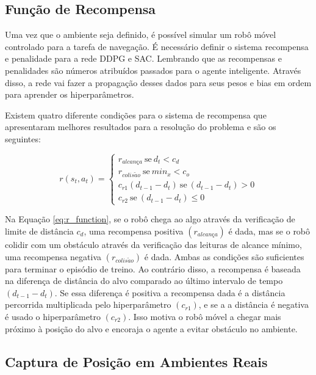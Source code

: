 \subsection{Função de Recompensa}
\label{sec:r_function}

Uma vez que o ambiente seja definido, é possível simular um robô móvel controlado para a tarefa de navegação.
É necessário definir o sistema recompensa e penalidade para a rede DDPG e SAC.
Lembrando que as recompensas e penalidades são números atribuídos passados para o agente inteligente.
Através disso, a rede vai fazer a propagação desses dados para seus pesos e bias em ordem para aprender os hiperparâmetros.

Existem quatro diferente condições para o sistema de recompensa que apresentaram melhores resultados para a resolução do problema e são os seguintes:

\begin{equation}
r (s_t, a_t) = 
\begin{cases}
r_{alcan\textit{ç}a} \ \textrm{se} \ d_t < c_d
\\
r_{colis\tilde{a}o} \ \textrm{se}\ min_x < c_o
\\
c_{r1}(d_{t-1} - d_t) \ \textrm{se} \ (d_{t-1} - d_t) > 0
\\
c_{r2} \ \textrm{se} \ (d_{t-1} - d_t) \leq 0
\end{cases}
\label{eq:r_function}
\end{equation}

Na Equação \ref{eq:r_function}, se o robô chega ao algo através da verificação de limite de distância $c_d$, uma recompensa positiva $(r_{alcan\textit{ç}a})$ é dada, mas se o robô colidir com um obstáculo através da verificação das leituras de alcance mínimo, uma recompensa negativa $(r_{colis\tilde{a}o})$ é dada.
Ambas as condições são suficientes para terminar o episódio de treino.
Ao contrário disso, a recompensa é baseada na diferença de distância do alvo comparado ao último intervalo de tempo $(d_{t-1} - d_t)$.
Se essa diferença é positiva a recompensa dada é a distância percorrida multiplicada pelo hiperparâmetro $(c_{r1})$, e se a a distância é negativa é usado o hiperparâmetro $(c_{r2})$.
Isso motiva o robô móvel a chegar mais próximo à posição do alvo e encoraja o agente a evitar obstáculo no ambiente.

\subsection{Captura de Posição em Ambientes Reais}

